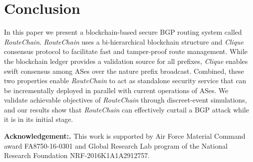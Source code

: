 \documentclass[5p]{elsarticle}
\newcommand{\BfPara}[1]{{\noindent\bf#1.}\xspace}
\newcommand{\rc}{{{\em RouteChain}}\xspace}
\newcommand{\etal}{{\em et al.}\xspace}
\begin{document}




\section{Conclusion}\label{sec:conclusion}
In this paper we present a blockchain-based secure BGP routing system called \rc. \rc uses a bi-hierarchical blockchain structure and {\em Clique} consensus protocol to facilitate fast and tamper-proof route management. While the blockchain ledger provides a validation source for all prefixes, {\em Clique} enables swift consensus among ASes over the nature prefix broadcast. Combined, these two properties enable \rc to act as standalone security service that can be incrementally deployed in parallel with current operations of ASes. We validate achievable objectives of \rc through discreet-event simulations, and our results show that \rc can effectively curtail a BGP attack while it is in its initial stage.  


\BfPara{Acknowledgement:}This work is supported by Air Force Material Command award FA8750-16-0301 and Global Research Lab program of the National Research Foundation NRF-2016K1A1A2912757.





\end{document}
